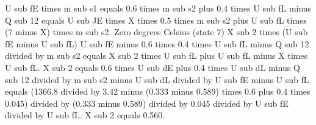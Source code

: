 U sub fE times m sub s1 equals 0.6 times m sub s2 plus 0.4 times U sub fL minus Q sub 12 equals U sub JE times X times 0.5 times m sub s2 plus U sub fL times (7 minus X) times m sub s2.  
Zero degrees Celsius (state 7)  
X sub 2 times (U sub fE minus U sub fL)  
U sub fE minus 0.6 times 0.4 times U sub fL minus Q sub 12 divided by m sub s2 equals X sub 2 times U sub fL plus U sub fL minus X times U sub fL.  
X sub 2 equals 0.6 times U sub dE plus 0.4 times U sub dL minus Q sub 12 divided by m sub s2 minus U sub dL divided by U sub fE minus U sub fL equals (1366.8 divided by 3.42 minus (0.333 minus 0.589) times 0.6 plus 0.4 times 0.045) divided by (0.333 minus 0.589) divided by 0.045 divided by U sub fE divided by U sub fL.  
X sub 2 equals 0.560.